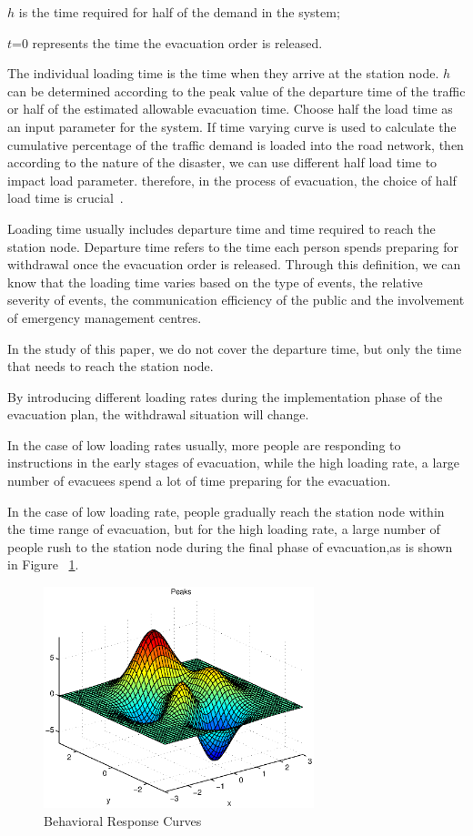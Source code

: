 \documentclass{mcmthesis}
\begin{document}
$h$ is the time required for half of the demand in the system;

$t$=0 represents the time the evacuation order is released.

The individual loading time is the time when they arrive at the station node. $h$ can be determined according to the peak value of the departure time of the traffic or half of the estimated allowable evacuation time. Choose half the load time as an input parameter for the system. If time varying curve is used to calculate the cumulative percentage of the traffic demand is loaded into the road network, then according to the nature of the disaster, we can use different half load time to impact load parameter. therefore, in the process of evacuation, the choice of half load time is crucial~\cite{Sayyady2010Optimizing,So2010Managing}.

Loading time usually includes departure time and time required to reach the station node. Departure time refers to the time each person spends preparing for withdrawal once the evacuation order is released. Through this definition, we can know that the loading time varies based on the type of events, the relative severity of events, the communication efficiency of the public and the involvement of emergency management centres.

In the study of this paper, we do not cover the departure time, but only the time that needs to reach the station node.

By introducing different loading rates during the implementation phase of the evacuation plan, the withdrawal situation will change.

In the case of low loading rates usually, more people are responding to instructions in the early stages of evacuation, while the high loading rate, a large number of evacuees spend a lot of time preparing for the evacuation.

In the case of low loading rate, people gradually reach the station node within the time range of evacuation, but for the high loading rate, a large number of people rush to the station node during the final phase of evacuation,as is shown in Figure ~\ref{fig:2}.

\begin{figure}[!htbp]
  \centering

  \includegraphics[width=0.7\textwidth]{./picture/figure2.eps}
  \caption{Behavioral Response Curves}\label{fig:2}
\end{figure}
\end{document}
